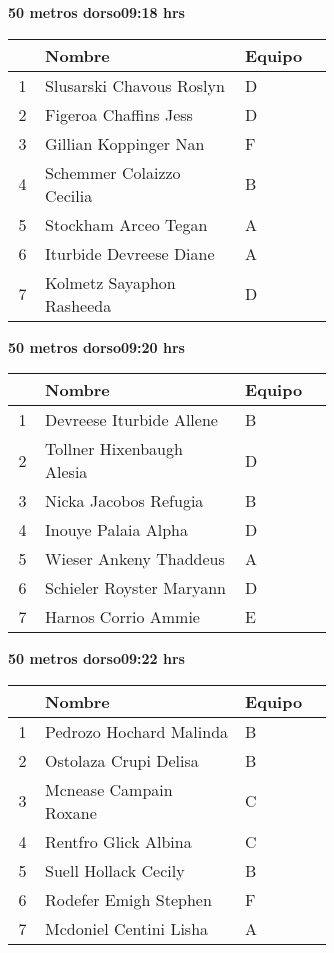 \begin{minipage}{0.95\linewidth}
\begin{center}
\textbf{
50 metros dorso\hspace{1cm}09:18 hrs}
\end{center}
\begin{tabular}{cp{0.63\linewidth}l}
\hline
& \textbf{Nombre} & \textbf{Equipo} \\ \hline
1 & Slusarski Chavous Roslyn & D \\ 
2 & Figeroa Chaffins Jess & D \\ 
3 & Gillian Koppinger Nan & F \\ 
4 & Schemmer Colaizzo Cecilia & B \\ 
5 & Stockham Arceo Tegan & A \\ 
6 & Iturbide Devreese Diane & A \\ 
7 & Kolmetz Sayaphon Rasheeda & D \\ 
\end{tabular}
\end{minipage}
\begin{minipage}{0.95\linewidth}
\begin{center}
\textbf{
50 metros dorso\hspace{1cm}09:20 hrs}
\end{center}
\begin{tabular}{cp{0.63\linewidth}l}
\hline
& \textbf{Nombre} & \textbf{Equipo} \\ \hline
1 & Devreese Iturbide Allene & B \\ 
2 & Tollner Hixenbaugh Alesia & D \\ 
3 & Nicka Jacobos Refugia & B \\ 
4 & Inouye Palaia Alpha & D \\ 
5 & Wieser Ankeny Thaddeus & A \\ 
6 & Schieler Royster Maryann & D \\ 
7 & Harnos Corrio Ammie & E \\ 
\end{tabular}
\end{minipage}
\begin{minipage}{0.95\linewidth}
\begin{center}
\textbf{
50 metros dorso\hspace{1cm}09:22 hrs}
\end{center}
\begin{tabular}{cp{0.63\linewidth}l}
\hline
& \textbf{Nombre} & \textbf{Equipo} \\ \hline
1 & Pedrozo Hochard Malinda & B \\ 
2 & Ostolaza Crupi Delisa & B \\ 
3 & Mcnease Campain Roxane & C \\ 
4 & Rentfro Glick Albina & C \\ 
5 & Suell Hollack Cecily & B \\ 
6 & Rodefer Emigh Stephen & F \\ 
7 & Mcdoniel Centini Lisha & A \\ 
\end{tabular}
\end{minipage}
